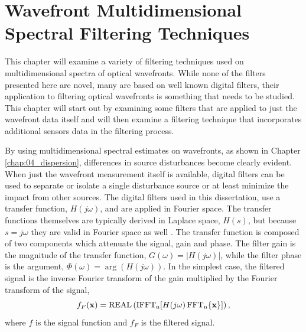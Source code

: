 
\chapter{Wavefront Multidimensional Spectral Filtering Techniques}
\label{chap:06_single_filter}

This chapter will examine a variety of filtering techniques used on multidimensional spectra of optical wavefronts.
While none of the filters presented here are novel, many are based on well known digital filters, their application to filtering optical wavefronts is something that needs to be studied.
This chapter will start out by examining some filters that are applied to just the wavefront data itself and will then examine a filtering technique that incorporates additional sensors data in the filtering process.

By using multidimensional spectral estimates on wavefronts, as shown in Chapter \ref{chap:04_dispersion}, differences in source disturbances become clearly evident.
When just the wavefront measurement itself is available, digital filters can be used to separate or isolate a single disturbance source or at least minimize the impact from other sources.
The digital filters used in this dissertation, use a transfer function, $H(j\omega)$, and are applied in Fourier space.
The transfer functions themselves are typically derived in Laplace space, $H(s)$, but because $s=j\omega$ they are valid in Fourier space as well \cite{Hamming-1998-CdhcDuvZ}.
The transfer function is composed of two components which attenuate the signal, gain and phase.
The filter gain is the magnitude of the transfer function, $G(\omega) = |H(j\omega)|$, while the filter phase is the argument, $\Phi(\omega) = \arg(H(j\omega))$.
In the simplest case, the filtered signal is the inverse Fourier transform of the gain multiplied by the Fourier transform of the signal,
\begin{equation}
 f_F(\mathbf{x}) = \operatorname{REAL}\left(\operatorname{IFFT_n}[H(j\mathbf{\omega})\operatorname{FFT_n}\{\mathbf{x}\}]\right) \textrm{,}
 \label{eqn:06_filter_function}
\end{equation}
where $f$ is the signal function and $f_F$ is the filtered signal.

